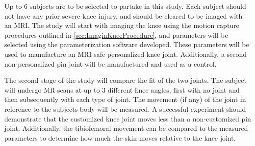 Up to 6 subjects are to be selected to partake in this study. Each subject should not have any prior severe knee injury, and should be cleared to be imaged with an MRI. The study will start with imaging the knee using the motion capture procedures outlined in \autoref{sec:ImaginKneeProcedure}, and parameters will be selected using the parameterization software developed. These parameters will be used to manufacture an MRI safe personalized knee joint. Additionally, a second non-personalized pin joint will be manufactured and used as a control.

The second stage of the study will compare the fit of the two joints. The subject will undergo MR scans at up to 3 different knee angles, first with no joint and then subsequently with each type of joint. The movement (if any) of the joint in reference to the subjects body will be measured. A successful experiment should demonstrate that the customized knee joint moves less than a non-customized pin joint. Additionally, the tibiofemoral movement can be compared to the measured parameters to determine how much the skin moves relative to the knee joint.
